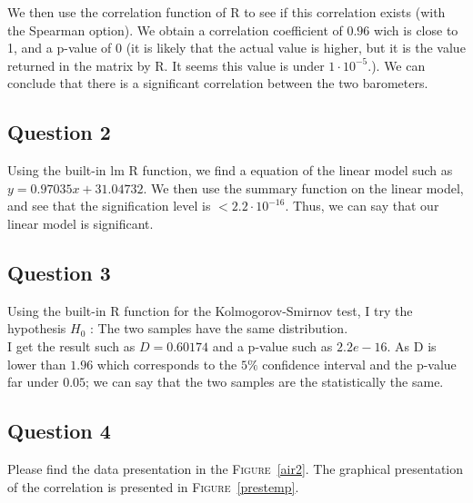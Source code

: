 \documentclass[12pt,a4paper]{article}
\begin{document}
We then use the correlation function of R to see if this correlation exists (with the Spearman option). We obtain a correlation coefficient of $0.96$ wich is close to 1, and a p-value of 0 (it is likely that the actual value is higher, but it is the value returned in the matrix by R. It seems this value is under $1\cdot 10^{-5}$.). We can conclude that there is a significant correlation between the two barometers.

\subsection*{Question 2}
Using the built-in lm R function, we find a equation of the linear model such as $y = 0.97035x + 31.04732$. We then use the summary function on the linear model, and see that the signification level is $<2.2 \cdot 10^{-16}$. Thus, we can say that our linear model is significant.

\subsection*{Question 3}
Using the built-in R function for the Kolmogorov-Smirnov test, I try the hypothesis $H_0$ : The two samples have the same distribution.\\
I get the result such as $D = 0.60174$ and a p-value such as $2.2e-16$. As D is lower than $1.96$ which corresponds to the $5\%$ confidence interval and the p-value far under $0.05$; we can say that the two samples are the statistically the same.\\

\subsection*{Question 4}
Please find the data presentation in the \textsc{Figure}~\ref{air2}. The graphical presentation of the correlation is presented in \textsc{Figure}~\ref{prestemp}.
\end{document}
